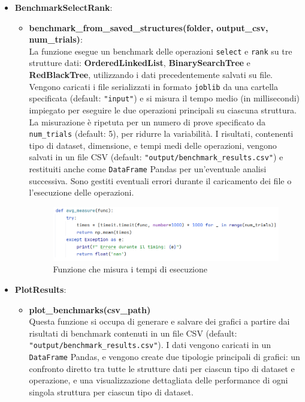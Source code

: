 \documentclass[10pt]{article}
\begin{document}
\begin{itemize}
\begin{itemize}
    \end{itemize}
    \item \textbf{BenchmarkSelectRank}:
    \begin{itemize}
        \item \textbf{benchmark\_from\_saved\_structures(folder, output\_csv, num\_trials)}:\\
        La funzione esegue un benchmark delle operazioni \texttt{select} e \texttt{rank} su tre strutture dati: \textbf{OrderedLinkedList}, \textbf{BinarySearchTree} e \textbf{RedBlackTree}, utilizzando i dati precedentemente salvati su file. Vengono caricati i file serializzati in formato \texttt{joblib} da una cartella specificata (default: \texttt{"input"}) e si misura il tempo medio (in millisecondi) impiegato per eseguire le due operazioni principali su ciascuna struttura. La misurazione è ripetuta per un numero di prove specificato da \texttt{num\_trials} (default: 5), per ridurre la variabilità. I risultati, contenenti tipo di dataset, dimensione, e tempi medi delle operazioni, vengono salvati in un file CSV (default: \texttt{"output/benchmark\_results.csv"}) e restituiti anche come \texttt{DataFrame} Pandas per un'eventuale analisi successiva. Sono gestiti eventuali errori durante il caricamento dei file o l'esecuzione delle operazioni.
        \begin{figure}[H]
            \centering
            \includegraphics[width=0.85\linewidth]{resources/funzioneTempo.png}
            \caption{Funzione che misura i tempi di esecuzione}
            \label{funzione tempo}
        \end{figure}
    \end{itemize}
    \item \textbf{PlotResults}:
    \begin{itemize}
        \item \textbf{plot\_benchmarks(csv\_path)}\\
        Questa funzione si occupa di generare e salvare dei grafici a partire dai risultati di benchmark contenuti in un file CSV (default: \texttt{"output/benchmark\_results.csv"}). I dati vengono caricati in un \texttt{DataFrame} Pandas, e vengono create due tipologie principali di grafici: un confronto diretto tra tutte le strutture dati per ciascun tipo di dataset e operazione, e una visualizzazione dettagliata delle performance di ogni singola struttura per ciascun tipo di dataset.

\end{itemize}
\end{itemize}
\end{document}

